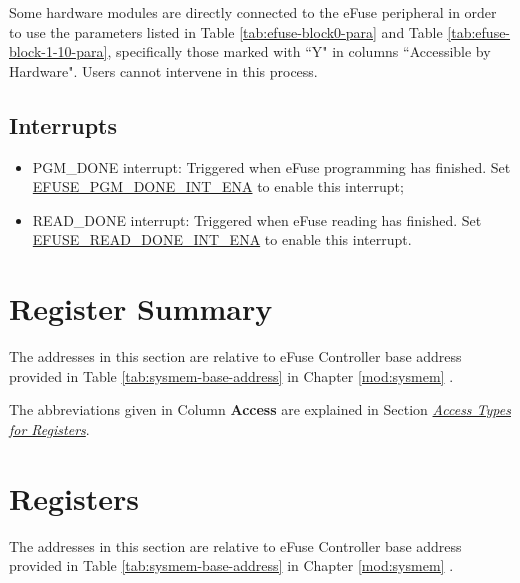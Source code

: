 \documentclass[main\_\_EN.tex]{subfiles}
\begin{document}
Some hardware modules are directly connected to the eFuse peripheral in order to use the parameters listed in Table \ref{tab:efuse-block0-para} and Table \ref{tab:efuse-block-1-10-para}, specifically those marked with ``Y" in columns ``Accessible by Hardware". Users cannot intervene in this process.

\subsection{Interrupts}
\begin{itemize}
\item PGM\_DONE interrupt: Triggered when eFuse programming has finished. Set \hyperref[fielddesc:EFUSEPGMDONEINTENA]{EFUSE\_PGM\_DONE\_INT\_ENA} to enable this interrupt;
\item READ\_DONE interrupt: Triggered when eFuse reading has finished. Set \hyperref[fielddesc:EFUSEREADDONEINTENA]{EFUSE\_READ\_DONE\_INT\_ENA} to enable this interrupt.
\end{itemize}





\clearpage
\hypertarget{efuse-reg-summ}{}
\section{Register Summary}
\label{sec:efuse-reg-summ}

The addresses in this section are relative to eFuse Controller base address provided in Table \ref{tab:sysmem-base-address} in Chapter \ref{mod:sysmem} \textit{}.

The abbreviations given in Column \textbf{Access} are explained in Section \hyperref[glossary-access-types]{\textit{Access Types for Registers}}.






\clearpage
\section{Registers}

The addresses in this section are relative to eFuse Controller base address provided in Table \ref{tab:sysmem-base-address} in Chapter \ref{mod:sysmem} \textit{}.


\end{document}
